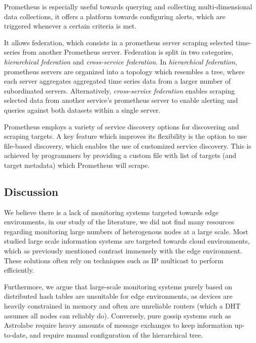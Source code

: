Prometheus is especially useful towards querying and collecting multi-dimensional data collections, it offers a platform towards configuring alerts, which are triggered whenever a certain criteria is met. 

It allows federation, which consists in a prometheus server scraping selected time-series from another Prometheus server. Federation is split in two categories, \textit{hierarchical federation} and \textit{cross-service federation}. In \textit{hierarchical federation}, prometheus servers are organized into a topology which resembles a tree, where each server aggregates aggregated time series data from a larger number of subordinated servers. Alternatively,  \textit{cross-service federation} enables scraping selected data from another service's prometheus server to enable alerting and queries against both datasets within a single server. 

Prometheus employs a variety of service discovery options for discovering and scraping targets. A key feature which improves its flexibility is the option to use file-based discovery, which enables the use of customized service discovery. This is achieved by programmers by providing a custom file with list of targets (and target metadata) which Prometheus will scrape.

\subsection{Discussion}

We believe there is a lack of monitoring systems targeted towards edge environments, in our study of the literature, we did not find many resources regarding monitoring large numbers of heterogenous nodes at a large scale. Most studied large scale information systems are targeted towards cloud environments, which as previously mentioned contrast immensely with the edge environment. These solutions often rely on techniques such as IP multicast \cite{massie2004ganglia} to perform efficiently.

Furthermore, we argue that large-scale monitoring systems purely based on distributed hash tables \cite{SDIMS} are unsuitable for edge environments, as  devices are heavily constrained in memory and often are unreliable routers (which a DHT assumes all nodes can reliably do). Conversely, pure gossip systems such as Astrolabe \cite{Renesse2003} require heavy amounts of message exchanges to keep information up-to-date, and require manual configuration of the hierarchical tree. 



